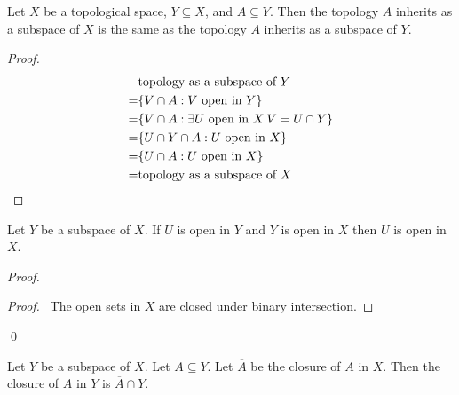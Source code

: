 \begin{lm}
  Let $X$ be a topological space, $Y \subseteq X$, and $A \subseteq Y$. Then
  the
  topology $A$ inherits as a subspace of $X$ is the same as the topology $A$
  inherits as a subspace of $Y$.
\end{lm}

\begin{proof}
  \pf
  \begin{align*}
    & \text{topology as a subspace of } Y \\
    = & \{ V \cap A : V \text{ open in } Y \} \\
    = & \{ V \cap A : \exists U \text{ open in } X. V = U \cap Y \} \\
    = & \{ U \cap Y \cap A : U \text{ open in } X \} \\
    = & \{ U \cap A : U \text{ open in } X \} \\
    = & \text{topology as a subspace of } X \qed
  \end{align*}
\end{proof}

\begin{lm}
  \label{lm:topology:subspace:open}
  Let $Y$ be a subspace of $X$. If $U$ is open in $Y$ and $Y$ is open in $X$
  then $U$ is open in $X$.
\end{lm}

\begin{proof}
  \pf
  \begin{proof}
    \pf\ The open sets in $X$ are closed under binary intersection.
  \end{proof}
  \qed
\end{proof}

\begin{thm}
  \label{thm:topology:subspace:closure}
  Let $Y$ be a subspace of $X$. Let $A \subseteq Y$. Let $\overline{A}$ be
  the
  closure of $A$ in $X$. Then the closure of $A$ in $Y$ is $\overline{A} \cap
  Y$.
\end{thm}

